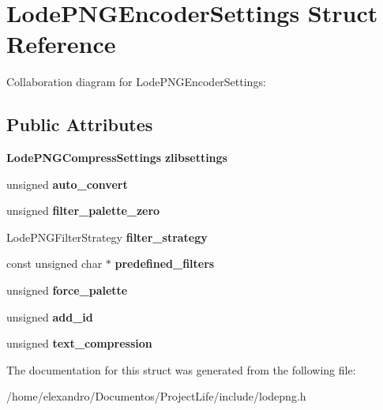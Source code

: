 \section{Lode\+P\+N\+G\+Encoder\+Settings Struct Reference}
\label{struct_lode_p_n_g_encoder_settings}


Collaboration diagram for Lode\+P\+N\+G\+Encoder\+Settings\+:
\subsection*{Public Attributes}
\begin{DoxyCompactItemize}
\item 
\mbox{\label{struct_lode_p_n_g_encoder_settings_a2c5928b4172c75e27de467870f2ff946}} 
\textbf{ Lode\+P\+N\+G\+Compress\+Settings} {\bfseries zlibsettings}
\item 
\mbox{\label{struct_lode_p_n_g_encoder_settings_a1203b8db6532c9ff4a5c8ee692cd327a}} 
unsigned {\bfseries auto\+\_\+convert}
\item 
\mbox{\label{struct_lode_p_n_g_encoder_settings_a0d82e8f2fabcb6cebbc54b80922945f1}} 
unsigned {\bfseries filter\+\_\+palette\+\_\+zero}
\item 
\mbox{\label{struct_lode_p_n_g_encoder_settings_a5e18e4eb941763a2e3e6c65ee9f0729c}} 
Lode\+P\+N\+G\+Filter\+Strategy {\bfseries filter\+\_\+strategy}
\item 
\mbox{\label{struct_lode_p_n_g_encoder_settings_a4446f87b5283f25664802a1be037e76e}} 
const unsigned char $\ast$ {\bfseries predefined\+\_\+filters}
\item 
\mbox{\label{struct_lode_p_n_g_encoder_settings_a04dc9622ccd1d7c74c56291409aa512a}} 
unsigned {\bfseries force\+\_\+palette}
\item 
\mbox{\label{struct_lode_p_n_g_encoder_settings_a893aa542aa7c122c32ee36dd716fbcb2}} 
unsigned {\bfseries add\+\_\+id}
\item 
\mbox{\label{struct_lode_p_n_g_encoder_settings_a6ffdcb8e85a65ea208fe027be072d710}} 
unsigned {\bfseries text\+\_\+compression}
\end{DoxyCompactItemize}


The documentation for this struct was generated from the following file\+:\begin{DoxyCompactItemize}
\item 
/home/elexandro/\+Documentos/\+Project\+Life/include/lodepng.\+h\end{DoxyCompactItemize}
